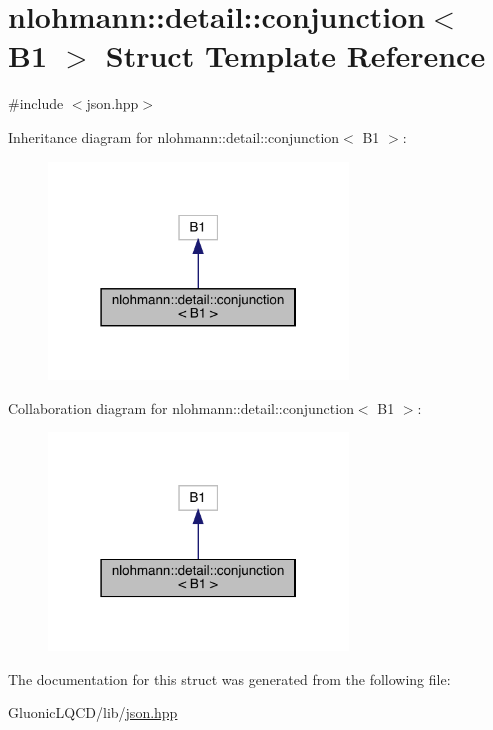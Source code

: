 \hypertarget{structnlohmann_1_1detail_1_1conjunction_3_01_b1_01_4}{}\section{nlohmann\+::detail\+::conjunction$<$ B1 $>$ Struct Template Reference}
\label{structnlohmann_1_1detail_1_1conjunction_3_01_b1_01_4}


{\ttfamily \#include $<$json.\+hpp$>$}



Inheritance diagram for nlohmann\+::detail\+::conjunction$<$ B1 $>$\+:
\nopagebreak
\begin{figure}[H]
\begin{center}
\leavevmode
\includegraphics[width=226pt]{structnlohmann_1_1detail_1_1conjunction_3_01_b1_01_4__inherit__graph}
\end{center}
\end{figure}


Collaboration diagram for nlohmann\+::detail\+::conjunction$<$ B1 $>$\+:
\nopagebreak
\begin{figure}[H]
\begin{center}
\leavevmode
\includegraphics[width=226pt]{structnlohmann_1_1detail_1_1conjunction_3_01_b1_01_4__coll__graph}
\end{center}
\end{figure}


The documentation for this struct was generated from the following file\+:\begin{DoxyCompactItemize}
\item 
Gluonic\+L\+Q\+C\+D/lib/\mbox{\hyperlink{json_8hpp}{json.\+hpp}}\end{DoxyCompactItemize}
